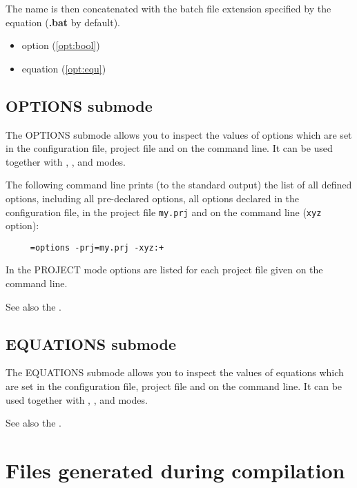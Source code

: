 The name is then concatenated  with the batch  file
extension specified by the equation 
({\bf.bat} by default).

\Seealso
\begin{itemize}
\item option    (\ref{opt:bool})
\item equation  (\ref{opt:equ})
\end{itemize}

\subsection{OPTIONS submode}\label{xc:modes:options}

The OPTIONS submode allows you to inspect the values of options which
are set in the configuration file, project file and on the command
line. It can be used together with
,
, and
 modes.

The following command line prints (to the standard output) the
list of all defined options, including all pre-declared options,
all options declared in the configuration file, in the project
file {\tt my.prj} and on the command line ({\tt xyz} option):

\verb'    '\xc{}\verb' =options -prj=my.prj -xyz:+'

In the PROJECT mode options are listed for each project file
given on the command line.

See also the .

\subsection{EQUATIONS submode}\label{xc:modes:equations}

The EQUATIONS submode allows you to inspect the values of equations
which are set in the configuration file, project file and on the command
line.
It can be used together with
,
, and
 modes.

See also the .

\section{Files generated during compilation}\label{usage:genfiles}

